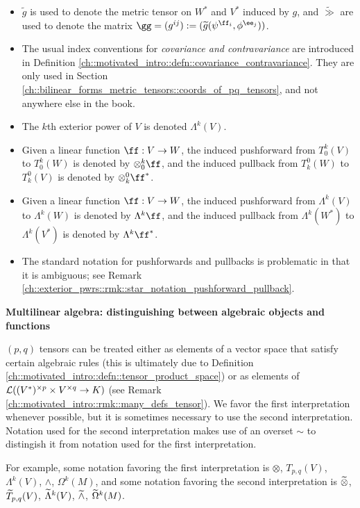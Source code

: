\begin{itemize}
    \item $\widetilde{g}$ is used to denote the metric tensor on $W^*$ and $V^*$ induced by $g$, and $\widetilde{\gg}$ are used to denote the matrix $\gg = (g^{ij}) := (\widetilde{g}(\psi^{\ff_i}, \phi^{\ee_j}))$.
    \item The usual index conventions for \textit{covariance and contravariance} are introduced in Definition \ref{ch::motivated_intro::defn::covariance_contravariance}. They are only used in Section \ref{ch::bilinear_forms_metric_tensors::coords_of_pq_tensors}, and not anywhere else in the book.
    \item The $k$th exterior power of $V$ is denoted $\Lambda^k(V)$.
    \item Given a linear function $\ff:V \rightarrow W$, the induced pushforward from $T^k_0(V)$ to $T^k_0(W)$ is denoted by $\otimes^k_0 \ff$, and the induced pullback from $T^0_k(W)$ to $T^0_k(V)$ is denoted by $\otimes^0_k \ff^*$.
    \item Given a linear function $\ff:V \rightarrow W$, the induced pushforward from $\Lambda^k(V)$ to $\Lambda^k(W)$ is denoted by $\Lambda^k \ff$, and the induced pullback from $\Lambda^k(W^*)$ to $\Lambda^k(V^*)$ is denoted by $\Lambda^k \ff^*$.
    \item The standard notation for pushforwards and pullbacks is problematic in that it is ambiguous; see Remark \ref{ch::exterior_pwrs::rmk::star_notation_pushforward_pullback}.
\end{itemize}

\textbf{Multilinear algebra: distinguishing between algebraic objects and functions}

$(p, q)$ tensors can be treated either as elements of a vector space that satisfy certain algebraic rules (this is ultimately due to Definition \ref{ch::motivated_intro::defn::tensor_product_space}) or as elements of $\mathcal{L}((V^*)^{\times p} \times V^{\times q} \rightarrow K)$ (see Remark \ref{ch::motivated_intro::rmk::many_defs_tensor}). We favor the first interpretation whenever possible, but it is sometimes necessary to use the second interpretation. Notation used for the second interpretation makes use of an overset $\sim$ to distingish it from notation used for the first interpretation. 

For example, some notation favoring the first interpretation is $\otimes$, $T_{p,q}(V)$, $\Lambda^k(V)$, $\wedge$, $\Omega^k(M)$, and some notation favoring the second interpretation is $\widetilde{\otimes}$, $\widetilde{T}_{p,q}(V)$, $\widetilde{\Lambda}^k(V)$, $\widetilde{\wedge}$, $\widetilde{\Omega}^k(M)$.

